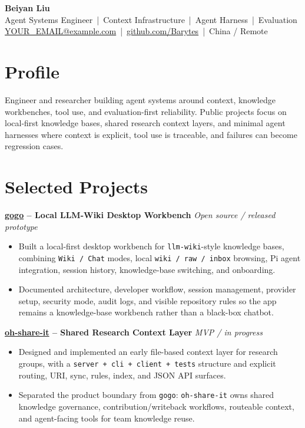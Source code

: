 \documentclass[10pt,letterpaper]{article}
\newcommand{\resumeItem}[1]{\item #1}
\newcommand{\projectHeading}[2]{
  \textbf{#1} \hfill \textit{#2}
}
\begin{document}
\begin{center}
  {\LARGE \textbf{Beiyan Liu}} \\
  \vspace{2pt}
  Agent Systems Engineer \,|\, Context Infrastructure \,|\, Agent Harness \,|\, Evaluation \\
  \vspace{2pt}
  \href{mailto:YOUR_EMAIL@example.com}{YOUR\_EMAIL@example.com} \,|\,
  \href{https://github.com/Barytes}{github.com/Barytes} \,|\,
  China / Remote
\end{center}

\section{Profile}
Engineer and researcher building agent systems around context, knowledge workbenches, tool use, and evaluation-first reliability. Public projects focus on local-first knowledge bases, shared research context layers, and minimal agent harnesses where context is explicit, tool use is traceable, and failures can become regression cases.

\section{Selected Projects}

\projectHeading{\href{https://github.com/Barytes/gogo}{gogo} -- Local LLM-Wiki Desktop Workbench}{Open source / released prototype}
\begin{itemize}
  \resumeItem{Built a local-first desktop workbench for \texttt{llm-wiki}-style knowledge bases, combining \texttt{Wiki / Chat} modes, local \texttt{wiki / raw / inbox} browsing, Pi agent integration, session history, knowledge-base switching, and onboarding.}
  \resumeItem{Documented architecture, developer workflow, session management, provider setup, security mode, audit logs, and visible repository rules so the app remains a knowledge-base workbench rather than a black-box chatbot.}
\end{itemize}

\projectHeading{\href{https://github.com/Barytes/oh-share-it}{oh-share-it} -- Shared Research Context Layer}{MVP / in progress}
\begin{itemize}
  \resumeItem{Designed and implemented an early file-based context layer for research groups, with a \texttt{server + cli + client + tests} structure and explicit routing, URI, sync, rules, index, and JSON API surfaces.}
  \resumeItem{Separated the product boundary from \texttt{gogo}: \texttt{oh-share-it} owns shared knowledge governance, contribution/writeback workflows, routeable context, and agent-facing tools for team knowledge reuse.}
\end{itemize}
\end{document}
